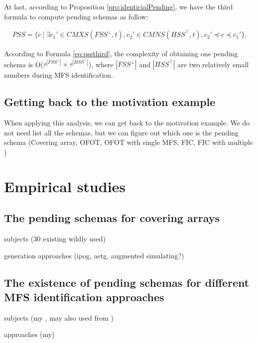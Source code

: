 {At last, according to Proposition \ref{pro:identicialPending}, we have the third formula to compute pending schemas as follow:

\begin{equation}\label{eq:pssthird}
\begin{aligned}
PSS =  \{ c\ |\ \exists c_{1}' \in CMXS(FSS^{\bot}, t), c_{2}' \in CMNS(HSS^{\top}, t), c_{2}' \preceq c \preceq c_{1}' \}.
\end{aligned}
\end{equation}

According to Formula \ref{eq:pssthird}, the complexity of obtaining one pending schema is O($ \tau^{|FSS^{\bot}|} \times \tau^{|HSS^{\top}|}$), where $|FSS^{\bot}|$ and $|HSS^{\top}|$ are two relatively small numbers during MFS identification.

\subsection{Getting back to the motivation example}
When applying this analysis, we can get back to the motivation example.
We do not need list all the schemas, but we can figure out which one is the pending schema (Covering array, OFOT, OFOT with single  MFS, FIC, FIC with multiple )



\section{Empirical studies}\label{sec:emp}


\subsection{The pending schemas for covering arrays}

subjects (30 existing wildly used)

generation approaches (ipog, aetg, augmented simulating?)

\subsection{The existence of pending schemas for different MFS identification approaches}

subjects (my , may also used from )

approaches (my)

}
